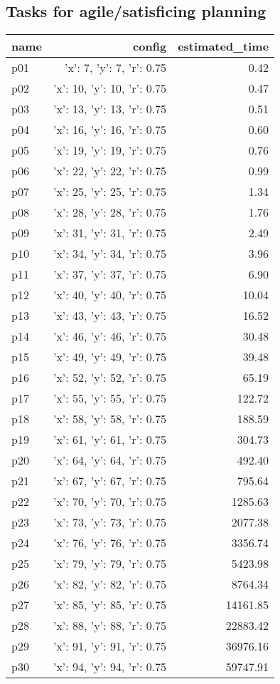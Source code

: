 \documentclass{article}
\begin{document}
                                \subsection*{Tasks for agile/satisficing planning}
                                
                            \begin{center}
                            \scriptsize
                            \begin{tabular}{@{}l|r|r@{}}
                            name & config & estimated\_time\\\midrule
                              p01&{'x': 7, 'y': 7, 'r': 0.75}&0.42\\
  p02&{'x': 10, 'y': 10, 'r': 0.75}&0.47\\
  p03&{'x': 13, 'y': 13, 'r': 0.75}&0.51\\
  p04&{'x': 16, 'y': 16, 'r': 0.75}&0.60\\
  p05&{'x': 19, 'y': 19, 'r': 0.75}&0.76\\
  p06&{'x': 22, 'y': 22, 'r': 0.75}&0.99\\
  p07&{'x': 25, 'y': 25, 'r': 0.75}&1.34\\
  p08&{'x': 28, 'y': 28, 'r': 0.75}&1.76\\
  p09&{'x': 31, 'y': 31, 'r': 0.75}&2.49\\
  p10&{'x': 34, 'y': 34, 'r': 0.75}&3.96\\
  p11&{'x': 37, 'y': 37, 'r': 0.75}&6.90\\
  p12&{'x': 40, 'y': 40, 'r': 0.75}&10.04\\
  p13&{'x': 43, 'y': 43, 'r': 0.75}&16.52\\
  p14&{'x': 46, 'y': 46, 'r': 0.75}&30.48\\
  p15&{'x': 49, 'y': 49, 'r': 0.75}&39.48\\
  p16&{'x': 52, 'y': 52, 'r': 0.75}&65.19\\
  p17&{'x': 55, 'y': 55, 'r': 0.75}&122.72\\
  p18&{'x': 58, 'y': 58, 'r': 0.75}&188.59\\
  p19&{'x': 61, 'y': 61, 'r': 0.75}&304.73\\
  p20&{'x': 64, 'y': 64, 'r': 0.75}&492.40\\
  p21&{'x': 67, 'y': 67, 'r': 0.75}&795.64\\
  p22&{'x': 70, 'y': 70, 'r': 0.75}&1285.63\\
  p23&{'x': 73, 'y': 73, 'r': 0.75}&2077.38\\
  p24&{'x': 76, 'y': 76, 'r': 0.75}&3356.74\\
  p25&{'x': 79, 'y': 79, 'r': 0.75}&5423.98\\
  p26&{'x': 82, 'y': 82, 'r': 0.75}&8764.34\\
  p27&{'x': 85, 'y': 85, 'r': 0.75}&14161.85\\
  p28&{'x': 88, 'y': 88, 'r': 0.75}&22883.42\\
  p29&{'x': 91, 'y': 91, 'r': 0.75}&36976.16\\
  p30&{'x': 94, 'y': 94, 'r': 0.75}&59747.91
                            \end{tabular}
                            \end{center}
                    
\end{document}
